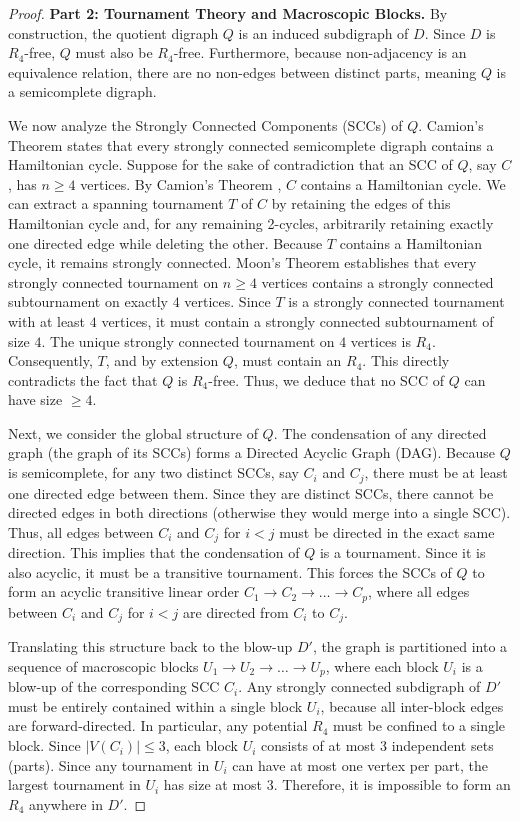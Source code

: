 \documentclass[a4paper]{amsart}
\begin{document}
\begin{proof}
    \textbf{Part 2: Tournament Theory and Macroscopic Blocks.}
    By construction, the quotient digraph $Q$ is an induced subdigraph of $D$. Since $D$ is $R_4$-free, $Q$ must also be $R_4$-free. Furthermore, because non-adjacency is an equivalence relation, there are no non-edges between distinct parts, meaning $Q$ is a semicomplete digraph.

    We now analyze the Strongly Connected Components (SCCs) of $Q$. Camion's Theorem \cite{camion1959} states that every strongly connected semicomplete digraph contains a Hamiltonian cycle. Suppose for the sake of contradiction that an SCC of $Q$, say $C$, has $n \ge 4$ vertices. By Camion's Theorem \cite{camion1959}, $C$ contains a Hamiltonian cycle. We can extract a spanning tournament $T$ of $C$ by retaining the edges of this Hamiltonian cycle and, for any remaining 2-cycles, arbitrarily retaining exactly one directed edge while deleting the other. Because $T$ contains a Hamiltonian cycle, it remains strongly connected. Moon's Theorem \cite{moon1966} establishes that every strongly connected tournament on $n \ge 4$ vertices contains a strongly connected subtournament on exactly $4$ vertices. Since $T$ is a strongly connected tournament with at least $4$ vertices, it must contain a strongly connected subtournament of size $4$. The unique strongly connected tournament on $4$ vertices is $R_4$. Consequently, $T$, and by extension $Q$, must contain an $R_4$. This directly contradicts the fact that $Q$ is $R_4$-free. Thus, we deduce that no SCC of $Q$ can have size $\ge 4$.

    Next, we consider the global structure of $Q$. The condensation of any directed graph (the graph of its SCCs) forms a Directed Acyclic Graph (DAG). Because $Q$ is semicomplete, for any two distinct SCCs, say $C_i$ and $C_j$, there must be at least one directed edge between them. Since they are distinct SCCs, there cannot be directed edges in both directions (otherwise they would merge into a single SCC). Thus, all edges between $C_i$ and $C_j$ for $i < j$ must be directed in the exact same direction. This implies that the condensation of $Q$ is a tournament. Since it is also acyclic, it must be a transitive tournament. This forces the SCCs of $Q$ to form an acyclic transitive linear order $C_1 \to C_2 \to \dots \to C_p$, where all edges between $C_i$ and $C_j$ for $i < j$ are directed from $C_i$ to $C_j$.

    Translating this structure back to the blow-up $D'$, the graph is partitioned into a sequence of macroscopic blocks $U_1 \to U_2 \to \dots \to U_p$, where each block $U_i$ is a blow-up of the corresponding SCC $C_i$. Any strongly connected subdigraph of $D'$ must be entirely contained within a single block $U_i$, because all inter-block edges are forward-directed. In particular, any potential $R_4$ must be confined to a single block. Since $|V(C_i)| \le 3$, each block $U_i$ consists of at most $3$ independent sets (parts). Since any tournament in $U_i$ can have at most one vertex per part, the largest tournament in $U_i$ has size at most $3$. Therefore, it is impossible to form an $R_4$ anywhere in $D'$.


\end{proof}
\end{document}
